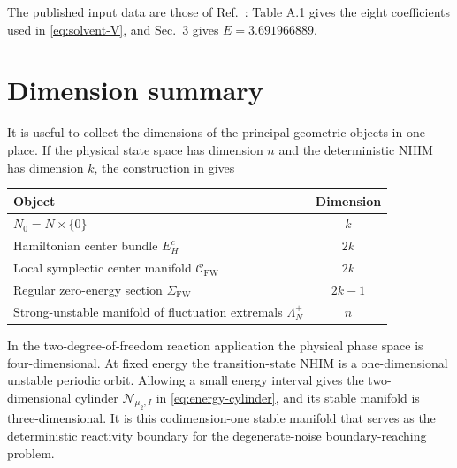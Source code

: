 \documentclass[11pt]{article}
\theoremstyle{definition}
\theoremstyle{remark}
\newcommand{\C}{\mathcal{C}}
\newcommand{\Lagr}{\Lambda}
\begin{document}
The published input data are those of Ref.~\cite{GarciaMeseguerCarpenterWiggins2019}: Table A.1 gives the eight coefficients used in \eqref{eq:solvent-V}, and Sec.~3 gives $E=3.691966889$.

\section{Dimension summary}

It is useful to collect the dimensions of the principal geometric objects in one place.  If the physical state space has dimension $n$ and the deterministic NHIM has dimension $k$, the construction in  gives
\begin{center}
\begin{tabular}{lc}
\toprule
Object & Dimension\\
\midrule
$N_0=N\times\{0\}$ & $k$\\
Hamiltonian center bundle $E_H^c$ & $2k$\\
Local symplectic center manifold $\C_{\mathrm{FW}}$ & $2k$\\
Regular zero-energy section $\Sigma_{\mathrm{FW}}$ & $2k-1$\\
Strong-unstable manifold of fluctuation extremals $\Lagr_N^+$ & $n$\\
\bottomrule
\end{tabular}
\end{center}

In the two-degree-of-freedom reaction application the physical phase space is four-dimensional.  At fixed energy the transition-state NHIM is a one-dimensional unstable periodic orbit.  Allowing a small energy interval gives the two-dimensional cylinder $\mathcal N_{\mu_2,I}$ in \eqref{eq:energy-cylinder}, and its stable manifold is three-dimensional.  It is this codimension-one stable manifold that serves as the deterministic reactivity boundary for the degenerate-noise boundary-reaching problem.
\end{document}
